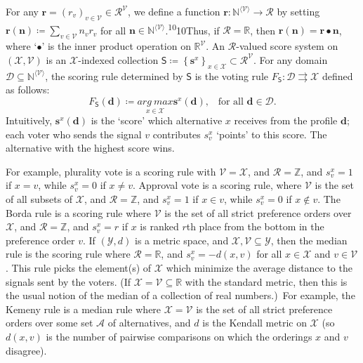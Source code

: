 \documentclass[
]{article}
\begin{document}
For any
\(\mathbf{r} = \left( r_{v} \right)_{v \in \mathcal{V}} \in \mathcal{R}^{\mathcal{V}}\),
we define a function
\(\left. \mathbf{r}:\mathbb{N}^{\langle\mathcal{V}\rangle}\longrightarrow\mathcal{R} \right.\)
by setting
\(\mathbf{r}\left( \mathbf{n} \right) ≔ \sum_{v \in \mathcal{V}}n_{v}r_{v}\)
for all
\(\mathbf{n} \in \mathbb{N}^{\langle\mathcal{V}\rangle}\).\textsuperscript{10}10Thus,
if \(\mathcal{R} = \mathbb{R}\), then
\(\mathbf{r}\left( \mathbf{n} \right) = \mathbf{r}\bullet\mathbf{n}\),
where `\(\bullet\)' is the inner product operation on
\(\mathbb{R}^{\mathcal{V}}\). An \(\mathcal{R}\)-valued score system on
\(\left( \mathcal{X},\mathcal{V} \right)\) is an \(\mathcal{X}\)-indexed
collection
\(\mathsf{S} ≔ \left\{ \mathbf{s}^{x} \right\}_{x \in \mathcal{X}} \subset \mathcal{R}^{\mathcal{V}}\).
For any domain
\(\mathcal{D} \subseteq \mathbb{N}^{\langle\mathcal{V}\rangle}\), the
scoring rule determined by \(\mathsf{S}\) is the voting rule
\(\left. F_{\mathsf{S}}:\mathcal{D}\rightrightarrows\mathcal{X} \right.\)
defined as follows:
\[F_{\mathsf{S}}\left( \mathbf{d} \right) ≔ \underset{x \in \mathcal{X}}{arg~max}\mathbf{s}^{x}\left( \mathbf{d} \right)\text{,}\quad\text{for~all~}\mathbf{d} \in \mathcal{D}\text{.}\]
Intuitively, \(\mathbf{s}^{x}\left( \mathbf{d} \right)\) is the `score'
which alternative \(x\) receives from the profile \(\mathbf{d}\); each
voter who sends the signal \(v\) contributes \(s_{v}^{x}\) `points' to
this score. The alternative with the highest score wins.

For example, plurality vote is a scoring rule with
\(\mathcal{V} = \mathcal{X}\), and \(\mathcal{R} = \mathbb{Z}\), and
\(s_{v}^{x} = 1\) if \(x = v\), while \(s_{v}^{x} = 0\) if \(x \neq v\).
Approval vote is a scoring rule, where \(\mathcal{V}\) is the set of all
subsets of \(\mathcal{X}\), and \(\mathcal{R} = \mathbb{Z}\), and
\(s_{v}^{x} = 1\) if \(x \in v\), while \(s_{v}^{x} = 0\) if
\(x \notin v\). The Borda rule is a scoring rule where \(\mathcal{V}\)
is the set of all strict preference orders over \(\mathcal{X}\), and
\(\mathcal{R} = \mathbb{Z}\), and \(s_{v}^{x} = r\) if \(x\) is ranked
\(r\)th place from the bottom in the preference order \(v\). If
\(\left( \mathcal{Y},d \right)\) is a metric space, and
\(\mathcal{X},\mathcal{V} \subseteq \mathcal{Y}\), then the median rule
is the scoring rule where \(\mathcal{R} = \mathbb{R}\), and
\(s_{v}^{x} = - d(x,v)\) for all \(x \in \mathcal{X}\) and
\(v \in \mathcal{V}\). This rule picks the element(s) of \(\mathcal{X}\)
which minimize the average distance to the signals sent by the voters.
(If \(\mathcal{X} = \mathcal{V} \subseteq \mathbb{R}\) with the standard
metric, then this is the usual notion of the median of a collection of
real numbers.)~For example, the Kemeny rule is a median rule where
\(\mathcal{X} = \mathcal{V}\) is the set of all strict preference orders
over some set \(\mathcal{A}\) of alternatives, and \(d\) is the Kendall
metric on \(\mathcal{X}\) (so \(d(x,v)\) is the number of pairwise
comparisons on which the orderings \(x\) and \(v\) disagree).
\end{document}
